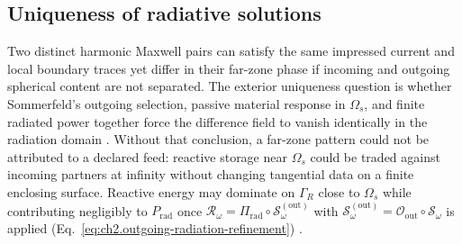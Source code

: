 \subsection{Uniqueness of radiative solutions}
\label{sec:ch243}

Two distinct harmonic Maxwell pairs can satisfy the same impressed current and local boundary
traces yet differ in their far-zone phase if incoming and outgoing spherical content are not
separated. The exterior uniqueness question is whether Sommerfeld's outgoing selection, passive
material response in $\Omega_s$, and finite radiated power together force the difference field to
vanish identically in the radiation domain \cite{sommerfeld1949,stratton1941,harrington2001}.
Without that conclusion, a far-zone pattern could not be attributed to a declared feed:
reactive storage near $\Omega_s$ could be traded against incoming partners at infinity without
changing tangential data on a finite enclosing surface. Reactive energy may dominate on $\Gamma_R$ close to $\Omega_s$ while
contributing negligibly to $P_{\mathrm{rad}}$ once
$\mathcal{R}_\omega=\Pi_{\mathrm{rad}}\circ\mathcal{S}_\omega^{\mathrm{(out)}}$ with
$\mathcal{S}_\omega^{\mathrm{(out)}}=\mathcal{O}_{\mathrm{out}}\circ\mathcal{S}_\omega$
is applied (Eq.~\eqref{eq:ch2.outgoing-radiation-refinement}) \cite{harrington2001}.

